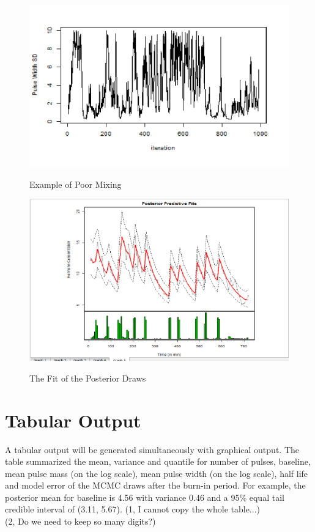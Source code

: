 \documentclass[11pt]{book}
\begin{document}
\begin{figure}
  \centering
  \includegraphics[width=\textwidth]{poormixing.PNG}\\
  \caption{Example of Poor Mixing}\label{poor mixing}
\end{figure}

\begin{figure}
  \centering
  \includegraphics[width=\textwidth]{fit.PNG}\\
  \caption{The Fit of the Posterior Draws}\label{fit}
\end{figure}

\section{Tabular Output}
A tabular output will be generated simultaneously with graphical output. The table summarized the mean, variance and quantile for number of pulses, baseline, mean pulse mass (on the log scale), mean pulse width (on the log scale), half life and model error of the MCMC draws after the burn-in period. For example, the posterior mean for baseline is 4.56 with variance 0.46 and a 95\% equal tail credible interval of (3.11, 5.67).
(1, I cannot copy the whole table...)\\
(2, Do we need to keep so many digits?)
\end{document}
